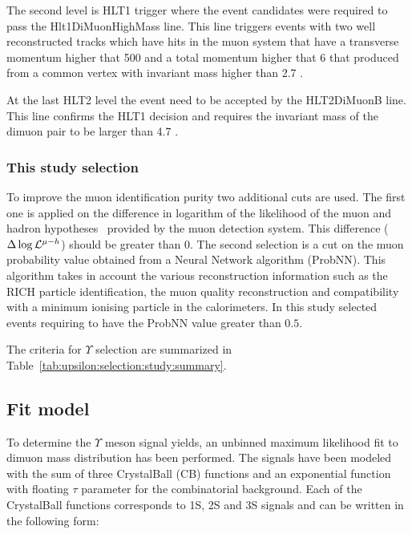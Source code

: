 The second level is HLT1 trigger where the event candidates were required to
pass the Hlt1DiMuonHighMass line.
This line triggers events with  two well reconstructed tracks  which have hits
in the muon system  that have a transverse momentum higher that 500 \mevc and 
a total momentum higher that 6 \gevc that produced from a common vertex with
invariant mass higher than 2.7 \gevcc.

At the last HLT2 level the event need to be accepted by the HLT2DiMuonB line.
This line confirms the HLT1 decision and requires the invariant mass of the
dimuon pair to be larger than 4.7 \gevcc.

\subsubsection{This study selection}
\label{sec:upsilon:selection:study}

To improve the muon identification purity two additional cuts are used. The
first one is applied on the difference in logarithm of the likelihood of the
muon and hadron hypotheses~\cite{Powell} provided by the muon detection system.
This difference ($\Delta\log\mathcal{L}^{\mu-h}$) should be greater than 0. The
second selection  is a cut on the muon probability value obtained from a Neural
Network algorithm (ProbNN). This algorithm takes in account the various
reconstruction information such as the RICH particle identification, the muon
quality reconstruction and compatibility with a minimum ionising particle in the
calorimeters. In this study selected events requiring to have the ProbNN value
greater than $0.5$.

The criteria for  $\Upsilon$ selection are summarized in
Table~\ref{tab:upsilon:selection:study:summary}.



\subsection{Fit model}
\label{sec:upsilon:fit}
To determine the $\Upsilon$ meson signal yields, an unbinned maximum likelihood
fit to dimuon mass distribution has been performed. The signals have been
modeled with the sum of three CrystalBall (CB) functions and an exponential
function with floating $\tau$ parameter for the combinatorial background. Each
of the CrystalBall functions corresponds to \Y1S, \Y2S and \Y3S signals and can
be written in the following form:


